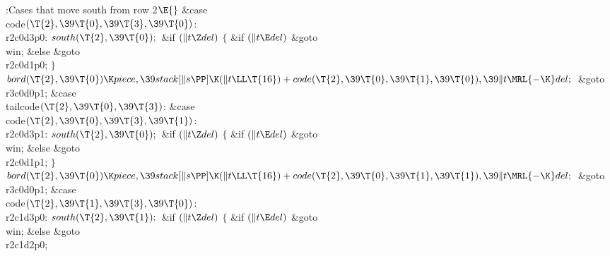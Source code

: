 \Y\B\4:Cases that move south from row 2\X${}\E{}$\6
\4\&{case} \\{code}${}(\T{2},\39\T{0},\39\T{3},\39\T{0}){}$:\5
\\{r2c0d3p0}:\5
${}\\{south}(\T{2},\39\T{0});{}$\6
\&{if} ${}(\|t\Z\\{del}){}$\5
${}\{{}$\5
\1\&{if} ${}(\|t\E\\{del}){}$\1\5
\&{goto} \\{win};\5
\2\&{else}\1\5
\&{goto} \\{r2c0d1p0};\5
\2${}\}{}$\2\6
${}\\{bord}(\T{2},\39\T{0})\K\\{piece},\39\\{stack}[\|s\PP]\K(\|t\LL\T{16})+%
\\{code}(\T{2},\39\T{0},\39\T{1},\39\T{0}),\39\|t\MRL{-{\K}}\\{del};{}$\6
\&{goto} \\{r3c0d0p1};\6
\4\&{case} \\{tailcode}${}(\T{2},\39\T{0},\39\T{3}){}$:\5
\&{case} \\{code}${}(\T{2},\39\T{0},\39\T{3},\39\T{1}){}$:\5
\\{r2c0d3p1}:\5
${}\\{south}(\T{2},\39\T{0});{}$\6
\&{if} ${}(\|t\Z\\{del}){}$\5
${}\{{}$\5
\1\&{if} ${}(\|t\E\\{del}){}$\1\5
\&{goto} \\{win};\5
\2\&{else}\1\5
\&{goto} \\{r2c0d1p1};\5
\2${}\}{}$\2\6
${}\\{bord}(\T{2},\39\T{0})\K\\{piece},\39\\{stack}[\|s\PP]\K(\|t\LL\T{16})+%
\\{code}(\T{2},\39\T{0},\39\T{1},\39\T{1}),\39\|t\MRL{-{\K}}\\{del};{}$\6
\&{goto} \\{r3c0d0p1};\6
\4\&{case} \\{code}${}(\T{2},\39\T{1},\39\T{3},\39\T{0}){}$:\5
\\{r2c1d3p0}:\5
${}\\{south}(\T{2},\39\T{1});{}$\6
\&{if} ${}(\|t\Z\\{del}){}$\5
${}\{{}$\5
\1\&{if} ${}(\|t\E\\{del}){}$\1\5
\&{goto} \\{win};\5
\2\&{else}\1\5
\&{goto} \\{r2c1d2p0};\5
